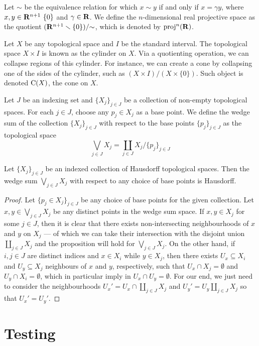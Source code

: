 \begin{example}\label{exp:real-projective-space}
Let \(\sim\) be the equivalence relation for which \(x \sim y\) if and only if \(x = \gamma
y\), where \(x, y \in \mathbf{R}^{n+1} \ \{0\}\) and \(\gamma \in \mathbf{R}\). We define the
\(n\)-dimensional real projective space as the quotient \((\mathbf{R}^{n+1} \smallsetminus
\{0\})/{\sim}\), which is denoted by \(\operatorname{proj}^{n}(\mathbf{R})\).
\end{example}

\begin{example}[Cone]\label{exp:cone}
Let \(X\) be any topological space and \(I\) be the standard interval. The
topological space \(X \times I\) is known as the cylinder on \(X\). Via a quotienting
operation, we can collapse regions of this cylinder. For instance, we can create
a cone by collapsing one of the sides of the cylinder, such as \((X \times I) / (X \times
\{0\})\). Such object is denoted \(\operatorname{C}(X)\), the cone on \(X\).
\end{example}

\begin{example}
\label{exp:wedge-sum-space}
Let \(J\) be an indexing set and \(\{X_j\}_{j \in J}\) be a collection of
non-empty topological spaces. For each \(j \in J\), choose any \(p_j \in X_j\) as a
base point. We define the wedge sum of the collection \(\{X_{j}\}_{j \in J}\) with
respect to the base points \(\{p_{j}\}_{j \in J}\) as the topological space
\[
  \bigvee_{j \in J} X_j = \coprod_{j \in J} X_j / \{p_{j}\}_{j \in J}
\]
\end{example}

\begin{proposition}
\label{prop:hausdorff-wedge-sum}
Let \(\{X_{j}\}_{j \in J}\) be an indexed collection of Hausdorff topological
spaces. Then the wedge sum \(\bigvee_{j \in J} X_j\) with respect to any choice of base
points is Hausdorff.
\end{proposition}

\begin{proof}
Let \(\{p_j \in X_j\}_{j \in J}\) be any choice of base points for the given
collection. Let \(x, y \in \bigvee_{j \in J} X_j\) be any distinct points in the wedge sum
space. If \(x, y \in X_j\) for some \(j \in J\), then it is clear that there exists
non-intersecting neighbourhoods of \(x\) and \(y\) on \(X_j\) --- of which we can
take their intersection with the disjoint union \(\coprod_{j \in J} X_j\) and the
proposition will hold for \(\bigvee_{j \in J} X_j\). On the other hand, if \(i, j \in J\)
are distinct indices and \(x \in X_i\) while \(y \in X_j\), then there exists \(U_x
\subseteq X_i\) and \(U_y \subseteq X_j\) neighbours of \(x\) and \(y\), respectively, such that
\(U_x \cap X_j = \emptyset\) and \(U_y \cap X_i = \emptyset\), which in particular imply in \(U_x \cap
U_y= \emptyset\). For our end, we just need to consider the neighbourhoods \(U_x' = U_x
\cap \coprod_{j \in J} X_j\) and \(U_y' = U_y \coprod_{j \in J} X_j\) so that \(U_x' = U_y'\).
\end{proof}

\section{Testing}